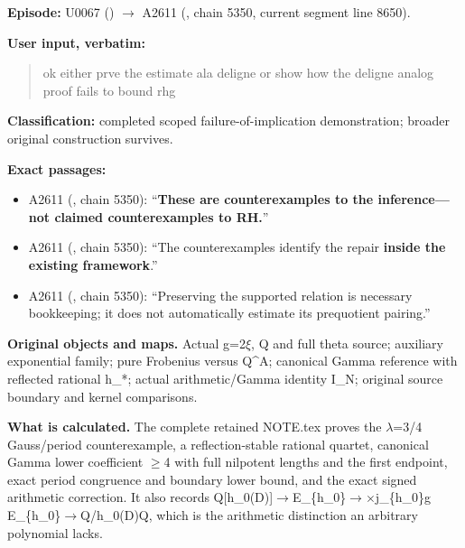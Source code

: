 \textbf{Episode:} U0067
(\protect{})
\allowbreak{}\ensuremath{→}\allowbreak{} A2611
(\protect{}, chain 5350,
current segment line 8650).

\textbf{User input, verbatim:}

\begin{quote}
ok either prve the estimate ala deligne or show how the deligne analog
proof fails to bound rhg
\end{quote}

\textbf{Classification:} completed scoped failure-of-implication
demonstration; broader original construction survives.

\textbf{Exact passages:}

\begin{itemize}
\tightlist
\item
  A2611 (\protect{}, chain
  5350): ``\textbf{These are counterexamples to the inference---not
  claimed counterexamples to RH.}''
\item
  A2611 (\protect{}, chain
  5350): ``The counterexamples identify the repair \textbf{inside the
  existing framework}.''
\item
  A2611 (\protect{}, chain
  5350): ``Preserving the supported relation is necessary bookkeeping;
  it does not automatically estimate its prequotient pairing.''
\end{itemize}

\textbf{Original objects and maps.} Actual
g=2\allowbreak{}\ensuremath{ξ}\allowbreak{}, Q and full theta source;
auxiliary exponential family; pure Frobenius versus Q\^{}A; canonical
Gamma reference with reflected rational h\_*; actual arithmetic/Gamma
identity I\_N; original source boundary and kernel comparisons.

\textbf{What is calculated.} The complete retained NOTE.tex proves the
\allowbreak{}\ensuremath{λ}\allowbreak{}=3/4 Gauss/period
counterexample, a reflection-stable rational quartet, canonical Gamma
lower coefficient \allowbreak{}\ensuremath{≥}\allowbreak{}4 with full
nilpotent lengths and the first endpoint, exact period congruence and
boundary lower bound, and the exact signed arithmetic correction. It
also records
Q[h\_0(D)]\allowbreak{}\ensuremath{→}\allowbreak{}E\_\{h\_0\}\allowbreak{}\ensuremath{→}\allowbreak{}\allowbreak{}\ensuremath{×}\allowbreak{}j\_\{h\_0\}g
E\_\{h\_0\}\allowbreak{}\ensuremath{→}\allowbreak{}Q/h\_0(D)Q, which is
the arithmetic distinction an arbitrary polynomial lacks.

